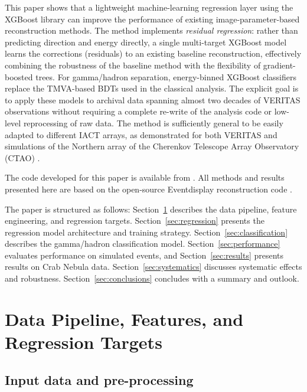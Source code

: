 \documentclass[12pt]{article}
\begin{document}
This paper shows that a lightweight machine-learning regression layer
using the XGBoost library \citep{Chen:2016:XST:2939672.2939785}
can improve the performance of existing image-parameter-based
reconstruction methods.
The method implements \textit{residual regression}: rather than predicting direction
and energy directly, a single multi-target XGBoost model learns the corrections
(residuals) to an existing baseline reconstruction, effectively combining the robustness
of the baseline method with the flexibility of gradient-boosted trees.
For gamma/hadron separation, energy-binned XGBoost classifiers replace the
TMVA-based BDTs used in the classical analysis.
The explicit goal is to apply these models to archival data spanning almost two
decades of VERITAS \citep{2006APh....25..391H} observations
without requiring a complete re-write of the analysis code or low-level reprocessing
of raw data.
The method is sufficiently general to be easily adapted to different IACT arrays,
as demonstrated for both VERITAS and simulations of the Northern array of the Cherenkov Telescope Array Observatory (CTAO)
\citep{2019scta.book.....C}.

The code developed for this paper is available from \citep{maier_2026_18412988}.
All methods and results presented here are based on the open-source Eventdisplay reconstruction
code \citep{maier_2025_17447664,maier_2026_18412887}.

The paper is structured as follows:
Section~\ref{sec:features_and_targets} describes the data pipeline, feature engineering,
and regression targets.
Section~\ref{sec:regression} presents the regression model architecture and training strategy.
Section~\ref{sec:classification} describes the gamma/hadron classification model.
Section~\ref{sec:performance} evaluates performance on simulated events,
and Section~\ref{sec:results} presents results on Crab Nebula data.
Section~\ref{sec:systematics} discusses systematic effects and robustness.
Section~\ref{sec:conclusions} concludes with a summary and outlook.


\section{Data Pipeline, Features, and Regression Targets}
\label{sec:features_and_targets}

\subsection{Input data and pre-processing}
\end{document}
